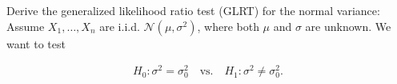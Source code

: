 
\begin{exercise}

Derive the generalized likelihood ratio test (GLRT) for the normal variance:
Assume $X_1,\dots,X_n$ are i.i.d. $\mathcal{N}(\mu,\sigma^2)$, where both $\mu$ and $\sigma$
are unknown. We want to test

\begin{align*}
  H_0: \sigma^2 = \sigma_0^2 \quad \text{vs.} \quad H_1: \sigma^2 \neq \sigma_0^2.
\end{align*}

\end{exercise}


\begin{solution}

  \phantom{}

\end{solution}

